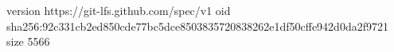 version https://git-lfs.github.com/spec/v1
oid sha256:92c331cb2ed850cde77bc5dce8503835720838262e1df50cffe942d0da2f9721
size 5566
